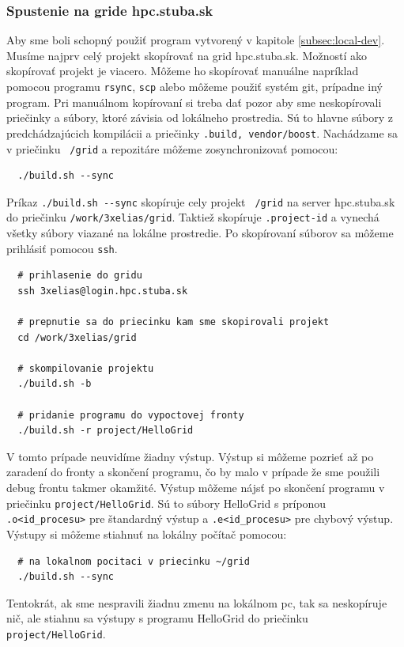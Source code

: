 \subsubsection{Spustenie na gride hpc.stuba.sk}
Aby sme boli schopný použiť program vytvorený v kapitole \ref{subsec:local-dev}. Musíme najprv celý projekt skopírovať na grid hpc.stuba.sk.
Možností ako skopírovať projekt je viacero. Môžeme ho skopírovať manuálne napríklad pomocou programu \texttt{rsync}, \texttt{scp}
alebo môžeme použiť systém git, prípadne iný program.
Pri manuálnom kopírovaní si treba dať pozor aby sme neskopírovali priečinky a súbory, ktoré závisia od lokálneho prostredia.
Sú to hlavne súbory z predchádzajúcich kompilácii a priečinky \texttt{.build, vendor/boost}.
Nachádzame sa v priečinku \texttt{~/grid} a repozitáre môžeme zosynchronizovať pomocou: 
\begin{lstlisting}
  ./build.sh --sync
\end{lstlisting}
Príkaz \texttt{./build.sh -{}-sync} skopíruje cely projekt \texttt{~/grid} na server hpc.stuba.sk do priečinku \texttt{/work/3xelias/grid}.
Taktiež skopíruje \texttt{.project-id} a vynechá všetky súbory viazané na lokálne prostredie.
Po skopírovaní súborov sa môžeme prihlásiť pomocou \texttt{ssh}.
\begin{lstlisting}
  # prihlasenie do gridu
  ssh 3xelias@login.hpc.stuba.sk

  # prepnutie sa do priecinku kam sme skopirovali projekt
  cd /work/3xelias/grid

  # skompilovanie projektu
  ./build.sh -b

  # pridanie programu do vypoctovej fronty
  ./build.sh -r project/HelloGrid
\end{lstlisting}
V tomto prípade neuvidíme žiadny výstup. Výstup si môžeme pozrieť až po zaradení do fronty a skončení programu, čo by malo v prípade že sme použili
debug frontu takmer okamžité. Výstup môžeme nájsť po skončení programu v priečinku \texttt{project/HelloGrid}. 
Sú to súbory HelloGrid s príponou \texttt{.o<id\_procesu>} pre štandardný výstup a \texttt{.e<id\_procesu>} pre chybový výstup.
Výstupy si môžeme stiahnuť na lokálny počítač pomocou:
\begin{lstlisting}
  # na lokalnom pocitaci v priecinku ~/grid
  ./build.sh --sync
\end{lstlisting}
Tentokrát, ak sme nespravili žiadnu zmenu na lokálnom pc, tak sa neskopíruje nič,
ale stiahnu sa výstupy s programu HelloGrid do priečinku \texttt{project/HelloGrid}.


